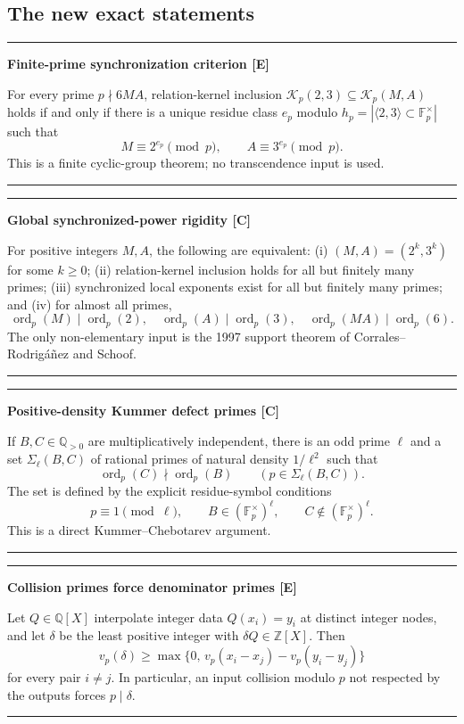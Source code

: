 \documentclass[11pt]{article}
\theoremstyle{definition}
\newcommand{\Z}{\mathbb Z}
\newcommand{\Q}{\mathbb Q}
\newcommand{\F}{\mathbb F}
\newcommand{\ord}{\operatorname{ord}}
\newcommand{\Rel}{\mathcal K}
\newcommand{\statusE}{\textcolor{deepgreen}{\textbf{[E]}}}
\newcommand{\statusC}{\textcolor{deepblue}{\textbf{[C]}}}
\newenvironment{resultbox}[1]
{\begin{center}\begin{minipage}{0.94\textwidth}\hrule\vspace{0.45em}\textbf{#1}\par\vspace{0.25em}}
{\vspace{0.35em}\hrule\end{minipage}\end{center}}
\begin{document}
\subsection{The new exact statements}

\begin{resultbox}{Finite-prime synchronization criterion \statusE}
For every prime $p\nmid6MA$, relation-kernel inclusion
$\Rel_p(2,3)\subseteq\Rel_p(M,A)$ holds if and only if there is a unique residue class
$e_p$ modulo $h_p=|\langle2,3\rangle\subset\F_p^\times|$ such that
\[
 M\equiv2^{e_p}\pmod p,
 \qquad
 A\equiv3^{e_p}\pmod p.
\]
This is a finite cyclic-group theorem; no transcendence input is used.
\end{resultbox}

\begin{resultbox}{Global synchronized-power rigidity \statusC}
For positive integers $M,A$, the following are equivalent:
(i) $(M,A)=(2^k,3^k)$ for some $k\ge0$;
(ii) relation-kernel inclusion holds for all but finitely many primes;
(iii) synchronized local exponents exist for all but finitely many primes; and
(iv) for almost all primes,
\[
 \ord_p(M)\mid\ord_p(2),\quad
 \ord_p(A)\mid\ord_p(3),\quad
 \ord_p(MA)\mid\ord_p(6).
\]
The only non-elementary input is the 1997 support theorem of
Corrales--Rodrig\'a\~nez and Schoof.
\end{resultbox}

\begin{resultbox}{Positive-density Kummer defect primes \statusC}
If $B,C\in\Q_{>0}$ are multiplicatively independent, there is an odd prime $\ell$ and a set
$\Sigma_\ell(B,C)$ of rational primes of natural density $1/\ell^2$ such that
\[
 \ord_p(C)\nmid\ord_p(B)
 \qquad(p\in\Sigma_\ell(B,C)).
\]
The set is defined by the explicit residue-symbol conditions
\[
 p\equiv1\pmod\ell,
 \qquad B\in(\F_p^\times)^\ell,
 \qquad C\notin(\F_p^\times)^\ell.
\]
This is a direct Kummer--Chebotarev argument.
\end{resultbox}

\begin{resultbox}{Collision primes force denominator primes \statusE}
Let $Q\in\Q[X]$ interpolate integer data $Q(x_i)=y_i$ at distinct integer nodes, and let
$\delta$ be the least positive integer with $\delta Q\in\Z[X]$.  Then
\[
 v_p(\delta)\ge
 \max\{0,\,v_p(x_i-x_j)-v_p(y_i-y_j)\}
\]
for every pair $i\ne j$.  In particular, an input collision modulo $p$ not respected by the
outputs forces $p\mid\delta$.
\end{resultbox}
\end{document}

